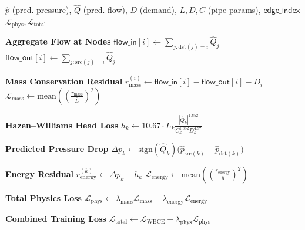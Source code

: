 \documentclass[final,5p,times,twocolumn,authoryear]{elsarticle}
\begin{document}
\begin{algorithm}[H]
\caption{Physics Loss Computation}
\label{alg:physics_loss}
\begin{algorithmic}[1]

\Require $\hat{p}$ (pred. pressure), $\hat{Q}$ (pred. flow), $D$ (demand), $L,D,C$ (pipe params), $\mathsf{edge\_index}$
\Ensure $\mathcal{L}_{\mathrm{phys}}, \mathcal{L}_{\mathrm{total}}$

\State \textbf{Aggregate Flow at Nodes}
\State $\mathsf{flow\_in}[i] \gets \sum_{j:\mathrm{dst}(j)=i} \hat{Q}_j$
\State $\mathsf{flow\_out}[i] \gets \sum_{j:\mathrm{src}(j)=i} \hat{Q}_j$

\State \textbf{Mass Conservation Residual}
\State $r^{(i)}_{\mathrm{mass}} \gets \mathsf{flow\_in}[i] - \mathsf{flow\_out}[i] - D_i$
\State $\mathcal{L}_{\mathrm{mass}} \gets \mathrm{mean}\!\left( \left(\frac{r_{\mathrm{mass}}}{\bar{D}}\right)^2 \right)$

\State \textbf{Hazen--Williams Head Loss}
\State $h_k \gets 10.67 \cdot L_k \frac{|\hat{Q}_k|^{1.852}}{C_k^{1.852} D_k^{4.87}}$

\State \textbf{Predicted Pressure Drop}
\State $\Delta p_k \gets \mathrm{sign}(\hat{Q}_k)\big(\hat{p}_{\mathrm{src}(k)} - \hat{p}_{\mathrm{dst}(k)}\big)$

\State \textbf{Energy Residual}
\State $r^{(k)}_{\mathrm{energy}} \gets \Delta p_k - h_k$
\State $\mathcal{L}_{\mathrm{energy}} \gets \mathrm{mean}\!\left( \left(\frac{r_{\mathrm{energy}}}{\bar{p}}\right)^2 \right)$

\State \textbf{Total Physics Loss}
\State $\mathcal{L}_{\mathrm{phys}} \gets \lambda_{\mathrm{mass}}\mathcal{L}_{\mathrm{mass}} + \lambda_{\mathrm{energy}}\mathcal{L}_{\mathrm{energy}}$

\State \textbf{Combined Training Loss}
\State $\mathcal{L}_{\mathrm{total}} \gets \mathcal{L}_{\mathrm{WBCE}} + \lambda_{\mathrm{phys}}\mathcal{L}_{\mathrm{phys}}$

\end{algorithmic}
\end{algorithm}
\end{document}
